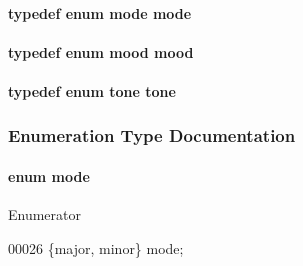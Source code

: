 \paragraph[{mode}]{\setlength{\rightskip}{0pt plus 5cm}typedef enum {\bf mode}  {\bf mode}}\label{main_8c_abcec22444f1b2fc64f59764d40244d9f}
\paragraph[{mood}]{\setlength{\rightskip}{0pt plus 5cm}typedef enum {\bf mood}  {\bf mood}}\label{main_8c_a3e304bbd72e3a576384c6e8cdb661eb4}
\paragraph[{tone}]{\setlength{\rightskip}{0pt plus 5cm}typedef enum {\bf tone}  {\bf tone}}\label{main_8c_aac01cecf1f254ffa121e2715527a6a5a}


\subsubsection{Enumeration Type Documentation}
\paragraph[{mode}]{\setlength{\rightskip}{0pt plus 5cm}enum {\bf mode}}\label{main_8c_a1a6b6fb557d8d37d59700faf4e4c9167}
\begin{Desc}
\item[Enumerator]\par
\begin{description}
\item[{\em 
major\label{main_8c_a1a6b6fb557d8d37d59700faf4e4c9167adc8c3476e4d3526d10210987c7131cb5}
}]\item[{\em 
minor\label{main_8c_a1a6b6fb557d8d37d59700faf4e4c9167a252026d6db6e81a42ef18bfd98b45a11}
}]\end{description}
\end{Desc}

\begin{DoxyCode}
00026 \{major, minor\} mode;
\end{DoxyCode}
